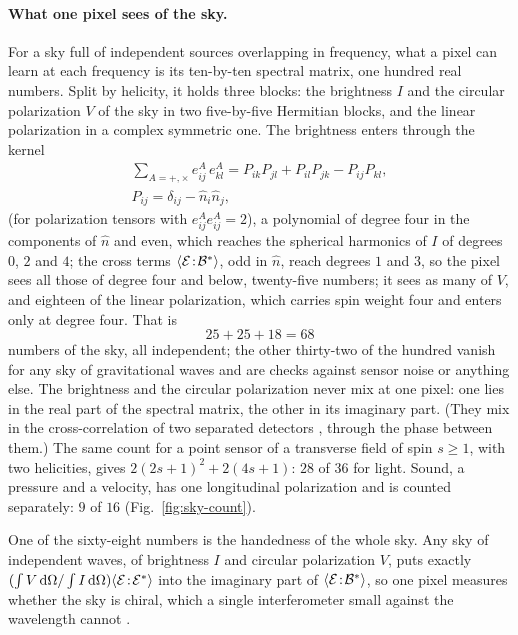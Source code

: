 \paragraph{What one pixel sees of the sky.} For a sky full of independent
sources overlapping in frequency, what a pixel can learn at each frequency is
its ten-by-ten spectral matrix, one hundred real numbers. Split by helicity, it
holds three blocks: the brightness $I$ and the circular polarization $V$ of the
sky in two five-by-five Hermitian blocks, and the linear polarization in a
complex symmetric one. The brightness enters through the kernel
\begin{equation}\label{eq:pixel-kernel}
\begin{gathered}
\sum_{A=+,\times} e^{A}_{ij}\, e^{A}_{kl}
= P_{ik}P_{jl} + P_{il}P_{jk} - P_{ij}P_{kl},\\
P_{ij} = \delta_{ij} - \hat n_i \hat n_j ,
\end{gathered}
\end{equation}
(for polarization tensors with $e^A_{ij}e^A_{ij} = 2$),
a polynomial of degree four in the components of $\hat n$ and even, which
reaches the spherical harmonics of $I$ of degrees $0$, $2$ and $4$; the cross terms
$\langle\mathcal{E}\!:\!\mathcal{B}^*\rangle$, odd in $\hat n$, reach degrees $1$ and $3$, so the
pixel sees all those of degree four and below, twenty-five numbers; it
sees as many of $V$, and eighteen of the linear polarization, which carries spin
weight four and enters only at degree four. That is
\begin{equation}\label{eq:sky-count}
25 + 25 + 18 = 68
\end{equation}
numbers of the sky, all independent; the other thirty-two of the hundred vanish
for any sky of gravitational waves and are checks against sensor noise or
anything else. The brightness and the circular polarization never mix at one
pixel: one lies in the real part of the spectral matrix, the other in its
imaginary part. (They mix in the cross-correlation of two separated detectors
\cite{Seto2006,SetoTaruya2007}, through the phase between them.) The
same count for a point sensor of a transverse field of spin $s \ge 1$, with two
helicities, gives $2(2s+1)^2 + 2(4s+1)$: $28$ of $36$ for light. Sound, a
pressure and a velocity, has one longitudinal polarization and is counted
separately: $9$ of $16$ (Fig.~\ref{fig:sky-count}).

One of the sixty-eight numbers is the handedness of the whole sky. Any
sky of independent waves, of brightness $I$ and circular polarization $V$, puts exactly
$(\int V\,\mathrm{d}\Omega/\int I\,\mathrm{d}\Omega)\langle\mathcal{E}\!:\!\mathcal{E}^*\rangle$ into the imaginary part of
$\langle\mathcal{E}\!:\!\mathcal{B}^*\rangle$, so one pixel measures
whether the sky is chiral, which a single interferometer small against the
wavelength cannot \cite{Seto2006}.

